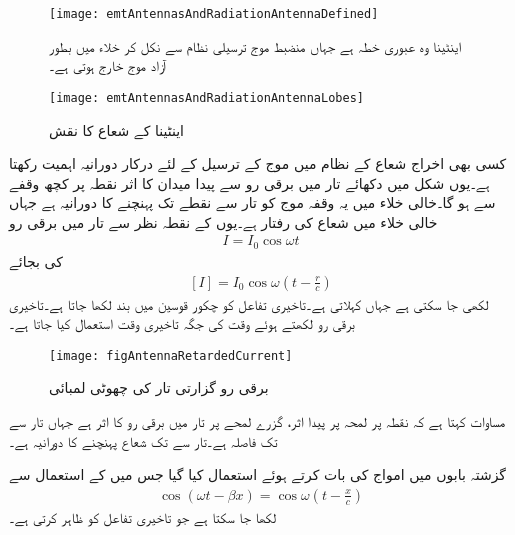 
\begin{figure}
\centering
\texttt{[image: emtAntennasAndRadiationAntennaDefined]}
\caption{اینٹینا وہ عبوری خطہ ہے جہاں منضبط موج ترسیلی نظام سے نکل کر خلاء میں بطور آزاد موج خارج ہوتی ہے۔}
\label{شکل_اینٹینا_تعارف}
\end{figure}

\begin{figure}
\centering
\texttt{[image: emtAntennasAndRadiationAntennaLobes]}
\caption{اینٹینا کے شعاع کا نقش}
\label{شکل_اینٹینا_شعاع_نقش}
\end{figure}

کسی بھی اخراج شعاع کے نظام میں موج کے ترسیل کے لئے درکار دورانیہ اہمیت رکھتا ہے۔یوں شکل  میں دکھائے تار میں برقی رو سے پیدا میدان کا اثر نقطہ  پر کچھ وقفے سے ہو گا۔خالی خلاء میں یہ وقفہ موج کو تار سے نقطے تک پہنچنے کا دورانیہ  ہے جہاں
  خالی خلاء میں  شعاع کی رفتار ہے۔یوں  کے نقطہ نظر سے تار میں برقی رو
\begin{align}
I=I_0 \cos \omega t
\end{align} 
کی بجائے
\begin{align}\label{مساوات_اینٹینا_تاخیری_رو}
[I]=I_0 \cos \omega  \left (t-\frac{r}{c} \right)
\end{align} 
لکھی جا سکتی ہے جہاں   کہلاتی ہے۔تاخیری تفاعل کو چکور قوسین میں بند لکھا جاتا ہے۔تاخیری برقی رو لکھتے ہوئے وقت  کی جگہ تاخیری وقت  استعمال کیا جاتا ہے۔

\begin{figure}
\centering
\texttt{[image: figAntennaRetardedCurrent]}
\caption{برقی رو گزارتی تار کی چھوٹی لمبائی}
\label{شکل_اینٹینا_تاخیری_رو}
\end{figure}

مساوات  کہتا ہے کہ نقطہ  پر لمحہ   پر پیدا اثر،  گزرے  لمحے  پر تار میں برقی رو کا اثر ہے جہاں تار سے  تک فاصلہ  ہے۔تار سے  تک شعاع پہنچنے کا دورانیہ  ہے۔

گزشتہ بابوں میں امواج کی بات کرتے ہوئے  استعمال کیا گیا جس میں  کے استعمال سے
\begin{align}
\cos (\omega t -\beta x)=\cos \omega\left( t- \frac{x}{c}\right)
\end{align}
لکھا جا سکتا ہے  جو تاخیری تفاعل کو ظاہر کرتی ہے۔

